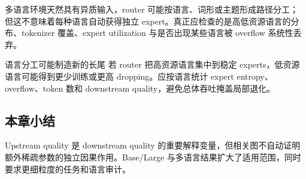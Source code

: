 多语言环境天然具有异质输入，router 可能按语言、词形或主题形成路径分工；但这不意味着每种语言自动获得独立 expert。真正应检查的是高低资源语言的分布、tokenizer 覆盖、expert utilization 与是否出现某些语言被 overflow 系统性丢弃。



\begin{warningbox}{语言分工可能制造新的长尾}
若 router 把高资源语言集中到稳定 experts，低资源语言可能得到更少训练或更高 dropping。应按语言统计 expert entropy、overflow、token 数和 downstream quality，避免总体吞吐掩盖局部退化。
\end{warningbox}

\subsection{本章小结}

Upstream quality 是 downstream quality 的重要解释变量，但相关图不自动证明额外稀疏参数的独立因果作用。Base/Large 与多语言结果扩大了适用范围，同时要求更细粒度的任务和语言审计。

